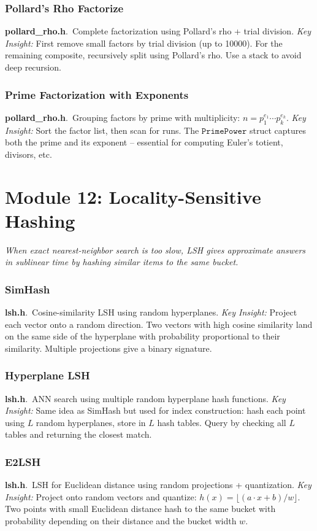 \documentclass[11pt,a4paper]{article}
\newcommand{\algo}[2]{\textbf{#1}.\ #2}
\newcommand{\insight}{\textit{Key Insight: }}
\begin{document}
\subsubsection{Pollard's Rho Factorize}
\algo{pollard\_rho.h}{Complete factorization using Pollard's rho + trial division.}
\insight First remove small factors by trial division (up to 10000). For the remaining composite, recursively split using Pollard's rho. Use a stack to avoid deep recursion.

\subsubsection{Prime Factorization with Exponents}
\algo{pollard\_rho.h}{Grouping factors by prime with multiplicity: \(n = p_1^{e_1} \cdots p_k^{e_k}\).}
\insight Sort the factor list, then scan for runs. The \(\texttt{PrimePower}\) struct captures both the prime and its exponent -- essential for computing Euler's totient, divisors, etc.

\section{Module 12: Locality-Sensitive Hashing}
\label{sec:lsh}

\textit{When exact nearest-neighbor search is too slow, LSH gives approximate answers in sublinear time by hashing similar items to the same bucket.}

\subsubsection{SimHash}
\algo{lsh.h}{Cosine-similarity LSH using random hyperplanes.}
\insight Project each vector onto a random direction. Two vectors with high cosine similarity land on the same side of the hyperplane with probability proportional to their similarity. Multiple projections give a binary signature.

\subsubsection{Hyperplane LSH}
\algo{lsh.h}{ANN search using multiple random hyperplane hash functions.}
\insight Same idea as SimHash but used for index construction: hash each point using \(L\) random hyperplanes, store in \(L\) hash tables. Query by checking all \(L\) tables and returning the closest match.

\subsubsection{E2LSH}
\algo{lsh.h}{LSH for Euclidean distance using random projections + quantization.}
\insight Project onto random vectors and quantize: \(h(x) = \lfloor (a \cdot x + b) / w \rfloor\). Two points with small Euclidean distance hash to the same bucket with probability depending on their distance and the bucket width \(w\).
\end{document}

